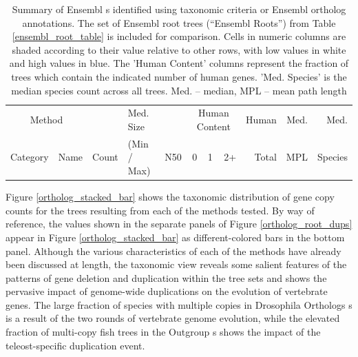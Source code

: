 \begin{landscape}
\begin{table}
\centering
\begin{tabular}{llrb{2.5cm}rrrrrrr}
\toprule
\multicolumn{2}{c}{Method} & &  Med. Size &  & \multicolumn{3}{c}{Human Content} & Human & Med. & Med. \\ \cmidrule(r){6-8} \cmidrule(r){1-2}
Category & Name & Count  & (Min / Max) & N50 & 0 & 1 & 2+ & Total & MPL & Species \\ 
  \midrule

\bottomrule
\end{tabular}
\caption{Summary of Ensembl \subtr{}s identified using taxonomic
  criteria or Ensembl ortholog annotations. The set of Ensembl root
  trees (``Ensembl Roots'') from Table \ref{ensembl_root_table} is
  included for comparison. Cells in numeric columns are shaded
  according to their value relative to other rows, with low values in
  white and high values in blue. The 'Human Content' columns represent
  the fraction of trees which contain the indicated number of human
  genes. 'Med. Species' is the median species count across all
  trees. Med. -- median, MPL -- mean path length}
\label{ensembl_subtree_table}
\end{table}
\end{landscape}

Figure \ref{ortholog_stacked_bar} shows the taxonomic distribution of
gene copy counts for the trees resulting from each of the \subtr
methods tested. By way of reference, the values shown in the separate
panels of Figure \ref{ortholog_root_dups} appear in Figure
\ref{ortholog_stacked_bar} as different-colored bars in the bottom
panel. Although the various characteristics of each of the \subtr
methods have already been discussed at length, the taxonomic view
reveals some salient features of the patterns of gene deletion and
duplication within the tree sets and shows the pervasive impact of
genome-wide duplications on the evolution of vertebrate genes. The
large fraction of species with multiple copies in Drosophila Orthologs
\subtr{}s is a result of the two rounds of vertebrate genome
evolution, while the elevated fraction of multi-copy fish trees in the
Outgroup \subtr{}s shows the impact of the teleost-specific
duplication event.

